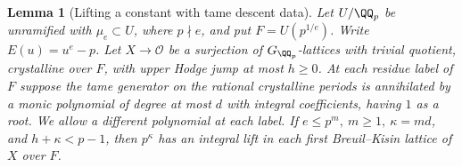 \documentclass[a4paper,11pt]{article}
\newtheorem{lemma}[proposition]{Lemma}
\theoremstyle{definition}
\theoremstyle{remark}
\numberwithin{equation}{section}
\begin{document}
\begin{lemma}[Lifting a constant with tame descent data]
\leavevmode\label{lem:tamemonomials800}
Let \(U/\QQ_p\) be unramified with \(\mu_e\subset U\), where
\(p\nmid e\), and put \(F=U(p^{1/e})\). Write \(E(u)=u^e-p\).
Let \(X\to\mathcal O\) be a surjection of \(G_{\QQ_p}\)-lattices
with trivial quotient, crystalline over \(F\), with upper
Hodge jump at most \(h\ge0\). At each residue label of \(F\)
suppose the tame generator on the rational crystalline
periods is annihilated by a monic polynomial of degree at
most \(d\) with integral coefficients, having \(1\) as a
root. We allow a different polynomial at each label.
If \(e\le p^m,\ m\ge1,\ \kappa=md\), and
\(h+\kappa<p-1\), then \(p^\kappa\) has an integral lift
in each first Breuil--Kisin lattice of \(X\) over \(F\).
\end{lemma}
\end{document}
